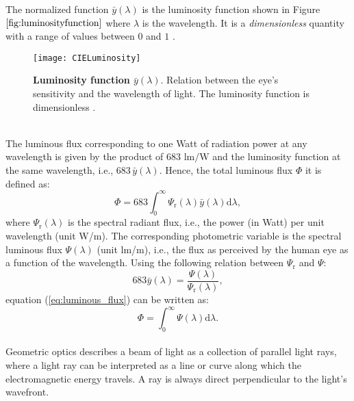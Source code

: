   The normalized function $\bar{y}(\lambda)$ is the luminosity function shown in Figure $\ref{fig:luminosityfunction}$ where $\lambda$ is the wavelength. It is a \textit{dimensionless} quantity with a range of values between $0$ and $1$ \cite{schubert2005light}.
\begin{figure}[t]
  \begin{center}
  \texttt{[image: CIELuminosity]}
  \end{center}
  \caption{\textbf{Luminosity function $\bar{y}(\lambda)$}. Relation between the eye's sensitivity and the wavelength of light. The luminosity function is dimensionless  \cite{wiki}.}
  \label{fig:luminosityfunction}
  \end{figure}
\\ \indent The luminous flux corresponding to one Watt of radiation power at any wavelength is given by the product of $683$ $\textrm{lm/W}$ and the luminosity function at the same wavelength,
i.e., $683 \, \bar{y}(\lambda)$. Hence, the total luminous flux $\Phi$ it is defined as:
\begin{equation}\label{eq:luminous_flux}
\Phi = 683 \int_0^\infty \Psi_\textrm{r}(\lambda) \bar{y}(\lambda)\textrm{d}\lambda,
\end{equation}
where $\Psi_\textrm{r}(\lambda)$ is the spectral radiant flux, i.e., the power (in Watt) per unit wavelength (unit \textrm{W}/\textrm{m}). The corresponding photometric variable is the spectral luminous flux $\Psi(\lambda)$ (unit \textrm{lm}/\textrm{m}), i.e., the flux as perceived by the human eye as a function of the wavelength. 
Using the following relation between $\Psi_\textrm{r}$ and $\Psi$:
\begin{equation}
683 \bar{y}(\lambda) = \frac{\Psi(\lambda)}{\Psi_\textrm{r}(\lambda)}, 
\end{equation}
equation (\ref{eq:luminous_flux}) can be written as:
\begin{equation}
\Phi = \int_0^\infty \Psi(\lambda)\textrm{d}\lambda.
\end{equation}
\\ \indent Geometric optics describes a beam of light as a collection of parallel light rays, where a light ray can be interpreted as a line or curve along which the electromagnetic energy travels. A ray is always direct perpendicular to the light's wavefront.  
